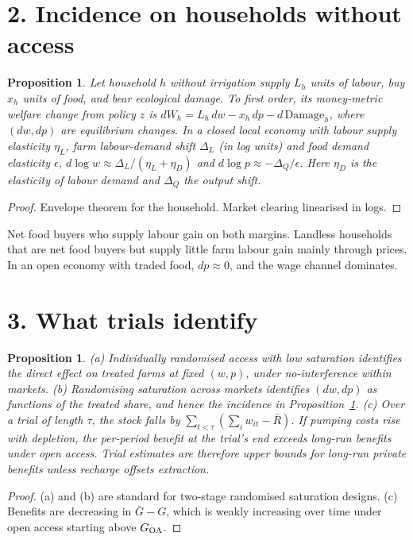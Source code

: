 \documentclass[11pt]{article}
\newtheorem{proposition}[theorem]{Proposition}
\theoremstyle{definition}
\begin{document}
\section*{2. Incidence on households without access}
\begin{proposition}\label{prop:incidence}
Let household $h$ without irrigation supply $L_h$ units of labour, buy $x_h$ units of food, and bear ecological damage. To first
order, its money-metric welfare change from policy $z$ is $dW_h=L_h\,dw-x_h\,dp-d\,\mathrm{Damage}_h$, where $(dw,dp)$ are
equilibrium changes. In a closed local economy with labour supply elasticity $\eta_L$, farm labour-demand shift $\Delta_L$
(in log units) and food demand elasticity $\epsilon$,
$d\log w\approx\Delta_L/(\eta_L+\eta_D)$ and $d\log p\approx-\Delta_Q/\epsilon$. Here $\eta_D$ is the elasticity of labour demand
and $\Delta_Q$ the output shift.
\end{proposition}
\begin{proof}
Envelope theorem for the household. Market clearing linearised in logs.
\end{proof}
Net food buyers who supply labour gain on both margins. Landless households that are net food buyers but supply little farm
labour gain mainly through prices. In an open economy with traded food, $dp\approx0$, and the wage channel dominates.

\section*{3. What trials identify}
\begin{proposition}\label{prop:trial}
(a) Individually randomised access with low saturation identifies the direct effect on treated farms at fixed $(w,p)$, under
no-interference within markets.
(b) Randomising saturation across markets identifies $(dw,dp)$ as functions of the treated share, and hence the incidence in
Proposition~\ref{prop:incidence}.
(c) Over a trial of length $\tau$, the stock falls by $\sum_{t<\tau}(\sum_iw_{it}-\bar R)$. If pumping costs rise with depletion,
the per-period benefit at the trial's end exceeds long-run benefits under open access. Trial estimates are therefore upper
bounds for long-run private benefits unless recharge offsets extraction.
\end{proposition}
\begin{proof}
(a) and (b) are standard for two-stage randomised saturation designs. (c) Benefits are decreasing in $\bar G-G$, which is
weakly increasing over time under open access starting above $G_{\rm OA}$.
\end{proof}
\end{document}
